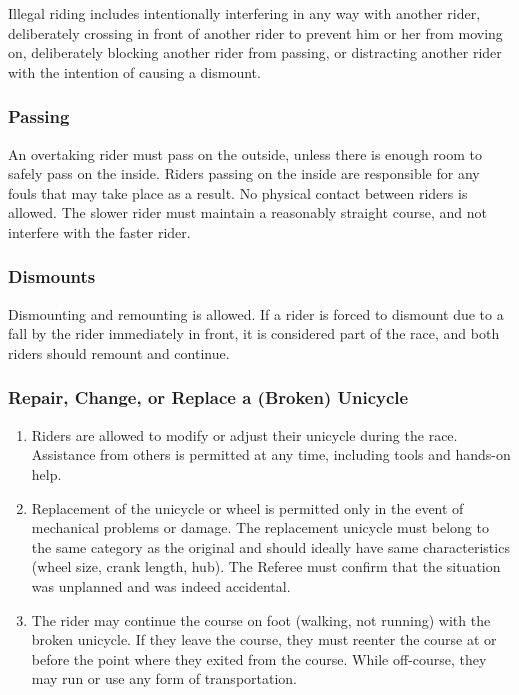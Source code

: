 Illegal riding includes intentionally interfering in any way with another rider, deliberately crossing in front of another rider to prevent him or her from moving on, deliberately blocking another rider from passing, or distracting another rider with the intention of causing a dismount.

\subsubsection{Passing}

An overtaking rider must pass on the outside, unless there is enough room to safely pass on the inside.
Riders passing on the inside are responsible for any fouls that may take place as a result.
No physical contact between riders is allowed.
The slower rider must maintain a reasonably straight course, and not interfere with the faster rider.

\subsubsection{Dismounts}

Dismounting and remounting is allowed.
If a rider is forced to dismount due to a fall by the rider immediately in front, it is considered part of the race, and both riders should remount and continue.

\subsubsection{Repair, Change, or Replace a (Broken) Unicycle \label{subsec:road_unicycle-changes}}

	\begin{enumerate}[leftmargin=1.5em,labelsep=*]
		\item Riders are allowed to modify or adjust their unicycle during the race.
		Assistance from others is permitted at any time, including tools and hands-on help.
		\item Replacement of the unicycle or wheel is permitted only in the event of mechanical problems or damage.
		The replacement unicycle must belong to the same category as the original and should ideally have same characteristics (wheel size, crank length, hub).
		The Referee must confirm that the situation was unplanned and was indeed accidental.
		\item The rider may continue the course on foot (walking, not running) with the broken unicycle.
		If they leave the course, they must reenter the course at or before the point where they exited from the course.
		While off-course, they may run or use any form of transportation.
	\end{enumerate}

